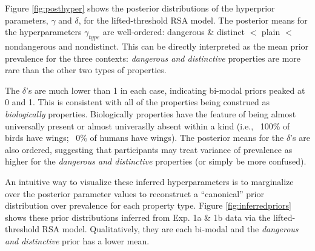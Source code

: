 \documentclass[10pt,letterpaper]{article}
\begin{document}
Figure \ref{fig:posthyper} shows the posterior distributions of the hyperprior parameters, $\gamma$ and $\delta$, for the lifted-threshold RSA model. The posterior means for the hyperparameters $\gamma_{type}$ are well-ordered: dangerous \& distinct $<$ plain $<$ nondangerous and nondistinct. This can be directly interpreted as the mean prior prevalence for the three contexts: \emph{dangerous and distinctive} properties are more rare than the other two types of properties. 

The $\delta$'s are much lower than 1 in each case, indicating bi-modal priors peaked at 0 and 1. This is consistent with all of the properties being construed as \emph{biologically} properties. Biologically properties have the feature of being almost universally present or almost univeraslly absent within a kind (i.e., ~100\% of birds have wings; ~0\% of humans have wings). The posterior means for the $\delta$'s are also ordered, suggesting that participants may treat variance of prevalence as higher for the \emph{dangerous and distinctive} properties (or simply be more confused).

An intuitive way to visualize these inferred hyperparameters is to marginalize over the posterior parameter values to reconstruct a ``canonical'' prior distribution over prevalence for each property type. Figure \ref{fig:inferredpriors} shows these prior distributions inferred from Exp. 1a \& 1b data via the lifted-threshold RSA model. 
Qualitatively, they are each bi-modal and the \emph{dangerous and distinctive} prior has a lower mean.



%
\end{document}
